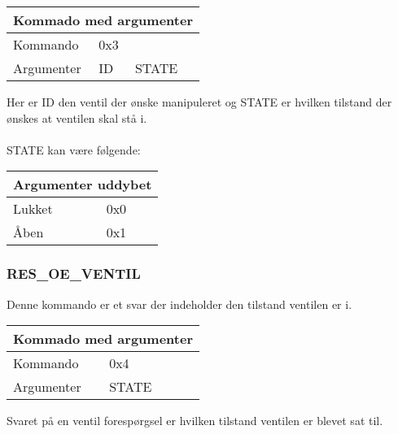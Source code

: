 \begin{table}[H]
\setlength{\parindent}{12pt}
\begin{tabular}{|l|lcc|}
\hline
\multicolumn{4}{|c|}{Kommado med argumenter}\\\hline
Kommando & 0x3 & & \\
Argumenter & ID & STATE & \\\hline
\end{tabular}
\end{table}

Her er ID den ventil der ønske manipuleret og STATE er hvilken tilstand der ønskes at ventilen skal stå i.\\\\
STATE kan være følgende:
\begin{table}[H]
\setlength{\parindent}{12pt}
\begin{tabular}{|l|l|}
\hline
\multicolumn{2}{|c|}{Argumenter uddybet}\\\hline
Lukket & 0x0 \\
Åben & 0x1 \\\hline
\end{tabular}
\end{table}

\subsubsection{RES\_OE\_VENTIL}
Denne kommando er et svar der indeholder den tilstand ventilen er i.

\begin{table}[H]
\setlength{\parindent}{12pt}
\begin{tabular}{|l|lcc|}
\hline
\multicolumn{4}{|c|}{Kommado med argumenter}\\\hline
Kommando & 0x4 & & \\
Argumenter & STATE & & \\\hline
\end{tabular}
\end{table}

Svaret på en ventil forespørgsel er hvilken tilstand ventilen er blevet sat til.